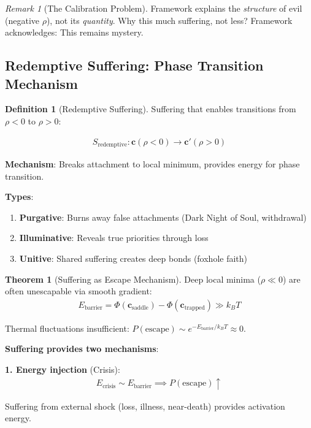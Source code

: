 \documentclass[11pt,a4paper]{article}
\theoremstyle{definition}
\newtheorem{definition}{Definition}[section]
\newtheorem{theorem}{Theorem}[section]
\theoremstyle{remark}
\newtheorem{remark}{Remark}[section]
\newcommand{\cc}{\mathbf{c}}
\begin{document}
\begin{enumerate}
\begin{remark}[The Calibration Problem]
Framework explains the \textit{structure} of evil (negative \(\rho\)), not its \textit{quantity}. Why this much suffering, not less? Framework acknowledges: This remains mystery.
\end{remark}

\subsection{Redemptive Suffering: Phase Transition Mechanism}

\begin{definition}[Redemptive Suffering]
Suffering that enables transitions from \(\rho < 0\) to \(\rho > 0\):

\begin{align}
S_{\text{redemptive}}: \cc(\rho < 0) \to \cc'(\rho > 0)
\end{align}

\textbf{Mechanism}: Breaks attachment to local minimum, provides energy for phase transition.

\textbf{Types}:
\begin{enumerate}
    \item \textbf{Purgative}: Burns away false attachments (Dark Night of Soul, withdrawal)
    \item \textbf{Illuminative}: Reveals true priorities through loss
    \item \textbf{Unitive}: Shared suffering creates deep bonds (foxhole faith)
\end{enumerate}
\end{definition}

\begin{theorem}[Suffering as Escape Mechanism]
Deep local minima (\(\rho \ll 0\)) are often unescapable via smooth gradient:
\begin{align}
E_{\text{barrier}} = \Phi(\cc_{\text{saddle}}) - \Phi(\cc_{\text{trapped}}) \gg k_B T
\end{align}

Thermal fluctuations insufficient: \(P(\text{escape}) \sim e^{-E_{\text{barrier}}/k_B T} \approx 0\).

\textbf{Suffering provides two mechanisms}:

\textbf{1. Energy injection} (Crisis):
\begin{align}
E_{\text{crisis}} \sim E_{\text{barrier}} \implies P(\text{escape}) \uparrow
\end{align}

Suffering from external shock (loss, illness, near-death) provides activation energy.


\end{theorem}
\end{enumerate}
\end{document}
